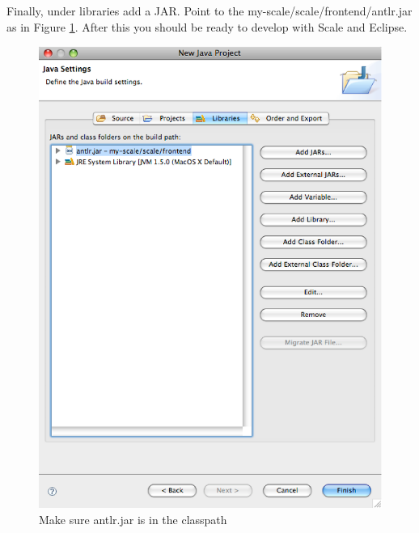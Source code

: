 \documentclass[12pt,twoside,letterpaper]{article}
\begin{document}
Finally, under libraries add a JAR. Point to the my-scale/scale/frontend/antlr.jar as in Figure \ref{fig:create_java_project_libraries}. After this you should be ready to develop with Scale and Eclipse.
\begin{figure}[htp]
\includegraphics[width=150mm]{create_java_project_libraries.eps}
\caption{Make sure antlr.jar is in the classpath}\label{fig:create_java_project_libraries}
\end{figure}
\end{document}
